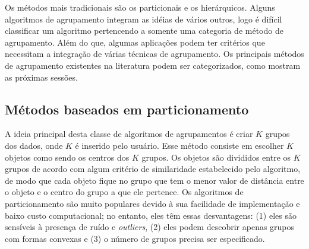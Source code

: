 Os métodos mais tradicionais são os particionais e os hierárquicos. Alguns algoritmos de agrupamento integram as idéias de vários outros, logo é difícil classificar um algoritmo pertencendo a somente uma categoria de método de agrupamento. Além do que, algumas aplicações podem ter critérios que necessitam a integração de várias técnicas de agrupamento.  Os principais métodos de agrupamento existentes na literatura podem ser categorizados, como mostram as próximas sessões.

\subsection{Métodos baseados em particionamento}
A ideia principal desta classe de algoritmos de agrupamentos é criar ${K}$ grupos dos dados, onde ${K}$ é inserido pelo usuário.
Esse método consiste em escolher ${K}$ objetos como sendo os centros dos ${K}$ grupos.
Os objetos são divididos entre os ${K}$ grupos de acordo com algum critério de similaridade
estabelecido pelo algoritmo, de modo que cada objeto fique no grupo que tem o menor valor de
distância entre o objeto e o centro do grupo a que ele pertence.
Os algoritmos de particionamento são muito populares devido à sua facilidade de implementação e baixo custo computacional; no entanto, eles têm essas desvantagens: (1) eles são sensíveis à presença de ruído e \textit{outliers}, (2) eles podem descobrir apenas grupos com formas convexas e (3) o número de grupos precisa ser especificado.

